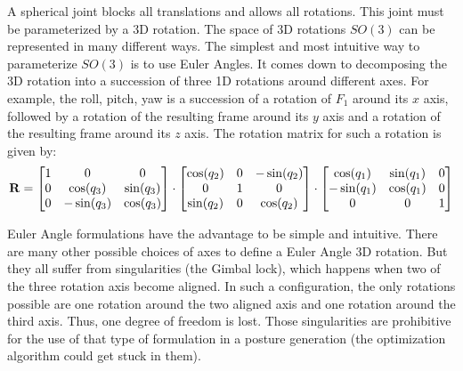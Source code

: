 A spherical joint blocks all translations and allows all rotations.
This joint must be parameterized by a 3D rotation.
The space of 3D rotations $SO(3)$ can be represented in many different ways.
The simplest and most intuitive way to parameterize $SO(3)$ is to use Euler Angles.
It comes down to decomposing the 3D rotation into a succession of three 1D rotations around different axes.
For example, the roll, pitch, yaw is a succession of a rotation of $F_1$ around its $x$ axis, followed by a rotation of the resulting frame around its $y$ axis and a rotation of the resulting frame around its $z$ axis.
The rotation matrix for such a rotation is given by:
\begin{equation}
  {\bf R} =
  \begin{bmatrix}
    1 & 0 & 0 \\
    0 & \cos(q_3) & \sin(q_3) \\
    0 & -\sin(q_3) & \cos(q_3) \\
  \end{bmatrix}
  \cdot
  \begin{bmatrix}
    \cos(q_2) & 0 & -\sin(q_2) \\
    0 & 1 & 0 \\
    \sin(q_2) & 0 & \cos(q_2) \\
  \end{bmatrix}
  \cdot
  \begin{bmatrix}
    \cos(q_1) & \sin(q_1) & 0 \\
    -\sin(q_1) & \cos(q_1) & 0 \\
    0 & 0 & 1
  \end{bmatrix}
\end{equation}

Euler Angle formulations have the advantage to be simple and intuitive.
There are many other possible choices of axes to define a Euler Angle 3D rotation.
But they all suffer from singularities (the Gimbal lock), which happens when two of the three rotation axis become aligned.
In such a configuration, the only rotations possible are one rotation around the two aligned axis and one rotation around the third axis.
Thus, one degree of freedom is lost.
Those singularities are prohibitive for the use of that type of formulation in a posture generation (the optimization algorithm could get stuck in them).

